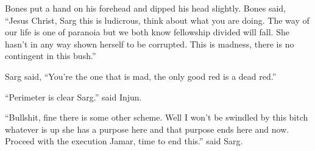 Bones put a hand on his forehead and dipped his head slightly. Bones said, ``Jesus Christ, Sarg this is ludicrous, think about what you are doing. The way of our life is one of paranoia but we both know fellowship divided will fall. She hasn't in any way shown herself to be corrupted. This is madness, there is no contingent in this bush.'' 

Sarg said, ``You're the one that is mad, the only good red is a dead red.''

``Perimeter is clear Sarg.'' said Injun. 

``Bullshit, fine there is some other scheme. Well I won't be swindled by this bitch whatever is up she has a purpose here and that purpose ends here and now. Proceed with the execution Jamar, time to end this.'' said Sarg.










